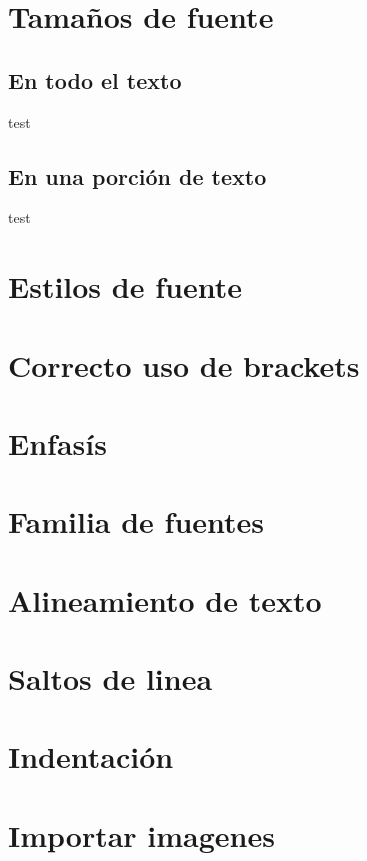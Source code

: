 \documentclass[../notes.tex]{subfiles}
\begin{document}
 
    \section{Tamaños de fuente}

        \subsection{En todo el texto}
        
            test
            
        \subsection{En una porción de texto}
        
            test
            
    \section{Estilos de fuente}
    
    \section{Correcto uso de brackets}
    
    \section{Enfasís}
    
    \section{Familia de fuentes}
    
    \section{Alineamiento de texto}
    
    \section{Saltos de linea}
    
    \section{Indentación}
    
    \section{Importar imagenes}
    
\end{document}
